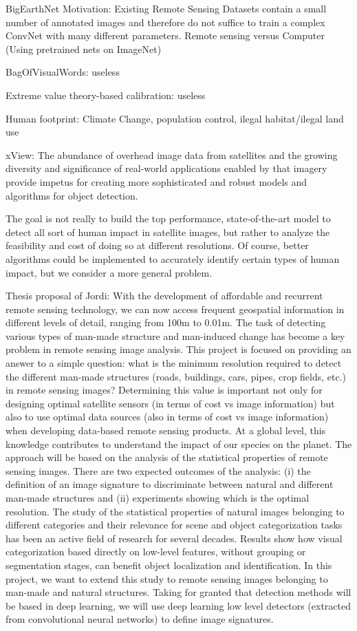 BigEarthNet Motivation:
Existing Remote Sensing Datasets contain a small number of annotated images and therefore do not suffice to train a complex ConvNet with many different parameters.
Remote sensing versus Computer (Using pretrained nets on ImageNet)


BagOfVisualWords: useless

Extreme value theory-based calibration: useless

Human footprint: Climate Change, population control, ilegal habitat/ilegal land use

xView: The abundance of overhead image data from
satellites and the growing diversity and significance of real-world applications enabled by that
imagery provide impetus for creating more sophisticated and robust models and algorithms for object detection.


The goal is not really to build the top performance, state-of-the-art model to detect all sort of human impact in satellite images, but rather to analyze the feasibility and cost of doing so at different resolutions. Of course, better algorithms could be implemented to accurately identify certain types of human impact, but we consider a more general problem.

Thesis proposal of Jordi: With the development of affordable and recurrent remote sensing technology, we can now access frequent geospatial information in different levels of detail, ranging from 100m to 0.01m. The task of detecting various types of man-made structure and man-induced change has become a key problem in remote sensing image analysis.
This project is focused on providing an answer to a simple question: what is the minimum resolution required to detect the different man-made structures (roads, buildings, cars, pipes, crop fields, etc.) in remote sensing images? Determining this value is important not only for designing optimal satellite sensors (in terms of cost vs image information) but also to use optimal data sources (also in terms of cost vs image information) when developing data-based remote sensing products. At a global level, this knowledge contributes to understand the impact of our species on the planet.
The approach will be based on the analysis of the statistical properties of remote sensing images. There are two expected outcomes of the analysis: (i) the definition of an image signature to discriminate between natural and different man-made structures and (ii) experiments showing which is the optimal resolution.
The study of the statistical properties of natural images belonging to different categories and their relevance for scene and object categorization tasks has been an active field of research for several decades. Results show how visual categorization based directly on low-level features, without grouping or segmentation stages, can benefit object localization and identification. In this project, we want to extend this study to remote sensing images belonging to man-made and natural structures. Taking for granted that detection methods will be based in deep learning, we will use deep learning low level detectors (extracted from convolutional neural networks) to define image signatures.




